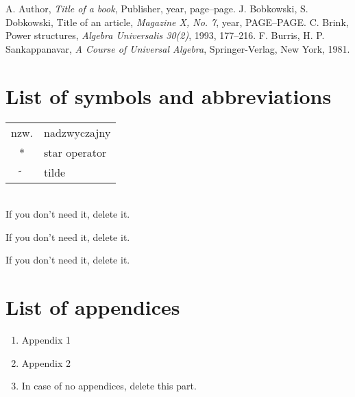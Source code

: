 \documentclass[a4paper,11pt,twoside]{report}
\theoremstyle{definition}
\begin{document}
\null\thispagestyle{empty}\newpage
\pagestyle{fancy}
\setcounter{page}{11}








\begin{thebibliography}{20} %

   A. Author, \emph{Title of a book}, Publisher, year, page--page.
   J. Bobkowski, S. Dobkowski, Title of an article, \emph{Magazine X, No. 7}, year, PAGE--PAGE.
   C. Brink, Power structures, \emph{Algebra Universalis 30(2)}, 1993, 177--216.
   F. Burris, H. P. Sankappanavar, \emph{A Course of Universal Algebra}, Springer-Verlag, New York, 1981.
\end{thebibliography}
\thispagestyle{empty}



\chapter*{List of symbols and abbreviations}

\begin{tabular}{cl}
  nzw.           & nadzwyczajny  \\
  *              & star operator \\
  $\widetilde{}$ & tilde
\end{tabular}
\\
If you don't need it, delete it.
\thispagestyle{empty}


\listoffigures
\thispagestyle{empty}
If you don't need it, delete it.


\renewcommand{\listtablename}{Spis tabel}
\listoftables
\thispagestyle{empty}
If you don't need it, delete it.

\chapter*{List of appendices}
\begin{enumerate}
  \item Appendix 1
  \item Appendix 2
  \item In case of no appendices, delete this part.
\end{enumerate}
\thispagestyle{empty}
\end{document}
